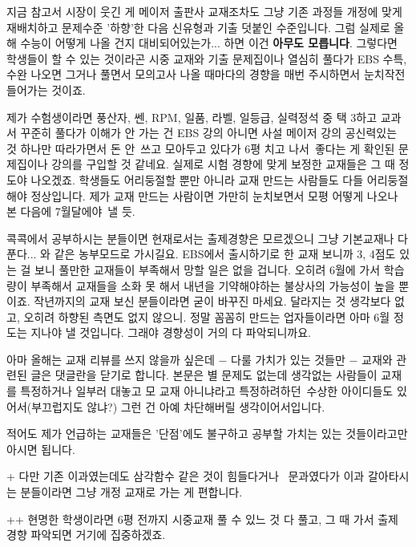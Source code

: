 지금 참고서 시장이 웃긴 게
메이저 출판사 교재조차도 그냥 기존 과정들 개정에 맞게 재배치하고 문제수준 '하향'한 다음 신유형과 기출 덧붙인 수준입니다.
그럼 실제로 올해 수능이 어떻게 나올 건지 대비되어있는가... 하면 이건 \textbf{아무도 모릅니다}.
그렇다면 학생들이 할 수 있는 것이라곤
시중 교재와 기출 문제집이나 열심히 풀다가 EBS 수특, 수완 나오면 그거나 풀면서
모의고사 나올 때마다의 경향을 매번 주시하면서 눈치작전 들어가는 것이죠.
\vspace{5mm}

제가 수험생이라면
풍산자, 쎈, RPM, 일품, 라벨, 일등급, 실력정석 중 택 3하고 교과서 꾸준히 풀다가
이해가 안 가는 건 EBS 강의 아니면 사설 메이저 강의 공신력있는 것 하나만 따라가면서
돈 안 쓰고 모아두고 있다가 6평 치고 나서 좋다는 게 확인된 문제집이나 강의를 구입할 것 같네요.
실제로 시험 경향에 맞게 보정한 교재들은 그 때 정도야 나오겠죠.
학생들도 어리둥절할 뿐만 아니라 교재 만드는 사람들도 다들 어리둥절해야 정상입니다.
제가 교재 만드는 사람이면 가만히 눈치보면서 모평 어떻게 나오나 본 다음에 7월달에야 낼 듯.
\vspace{5mm}

콕콕에서 공부하시는 분들이면 현재로서는 출제경향은 모르겠으니 그냥 기본교재나 다 푼다... 와 같은 농부모드로 가시길요.
EBS에서 출시하기로 한 교재 보니까 3, 4점도 있는 걸 보니 풀만한 교재들이 부족해서 망할 일은 없을 겁니다.
오히려 6월에 가서 학습량이 부족해서 교재들을 소화 못 해서 내년을 기약해야하는 불상사의 가능성이 높을 뿐이죠.
작년까지의 교재 보신 분들이라면 굳이 바꾸진 마세요. 달라지는 것 생각보다 없고, 오히려 하향된 측면도 없지 않으니.
정말 꼼꼼히 만드는 업자들이라면 아마 6월 정도는 지나야 낼 것입니다. 그래야 경향성이 거의 다 파악되니까요.
\vspace{5mm}

아마 올해는 교재 리뷰를 쓰지 않을까 싶은데 $-$ 다룰 가치가 있는 것들만 $-$
교재와 관련된 글은 댓글란을 닫기로 합니다.
본문은 별 문제도 없는데 생각없는 사람들이 교재를 특정하거나
일부러 대놓고 모 교재 아니냐라고 특정하려하던 수상한 아이디들도 있어서(부끄럽지도 않냐?)
그런 건 아예 차단해버릴 생각이어서입니다.
\vspace{5mm}

적어도 제가 언급하는 교재들은 '단점'에도 불구하고 공부할 가치는 있는 것들이라고만 아시면 됩니다.
\vspace{5mm}

+ 다만 기존 이과였는데도 삼각함수 같은 것이 힘들다거나  문과였다가 이과 갈아타시는 분들이라면 그냥 개정 교재로 가는 게 편합니다.
\vspace{5mm}

++ 현명한 학생이라면 6평 전까지 시중교재 풀 수 있느 것 다 풀고, 그 때 가서 출제 경향 파악되면 거기에 집중하겠죠.
\vspace{5mm}








